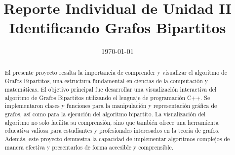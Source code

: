 \documentclass[conference]{IEEEtran}
\date{\specialdate\today}
\begin{document}
%
%
%

\newcommand{\breite}{0.9} %
\newcommand{\RelacionFiguradoscolumnas}{0.9}
\newcommand{\RelacionFiguradoscolumnasPuntoCinco}{0.45}




\title{Reporte Individual de Unidad II\\ Identificando Grafos Bipartitos}

\author{
}



\maketitle

\begin{abstract} 
\textbf{} El presente proyecto resalta la importancia de comprender y visualizar el algoritmo de Grafos Bipartitos, una estructura fundamental en ciencias de la computación y matemáticas. El objetivo principal fue desarrollar una visualización interactiva del algoritmo de Grafos Bipartitos utilizando el lenguaje de programación C++. Se implementaron clases y funciones para la manipulación y representación gráfica de grafos, así como para la ejecución del algoritmo bipartito. La visualización del algoritmo no solo facilita su comprensión, sino que también ofrece una herramienta educativa valiosa para estudiantes y profesionales interesados en la teoría de grafos. Además, este proyecto demuestra la capacidad de implementar algoritmos complejos de manera efectiva y presentarlos de forma accesible y comprensible.
\end{abstract}

\end{document}

